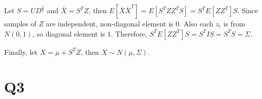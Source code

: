 \documentclass{article}
\begin{document}
Let $S=UD^{\frac{1}{2}}$ and $\bar{X}=S^TZ$, then
$E[\bar{X}\bar{X}^T]
= E[S^TZZ^TS]
= S^TE[ZZ^T]S$.
Since samples of $Z$ are independent, non-diagonal element is $0$.
Also each $z_i$ is from $N(0,1)$, so diagonal element is $1$.
Therefore, $S^TE[ZZ^T]S = S^TIS = S^TS = \Sigma$.

Finally, let $X = \mu + S^TZ$, then $X \sim N(\mu, \Sigma)$.

\section{Q3}
\end{document}
